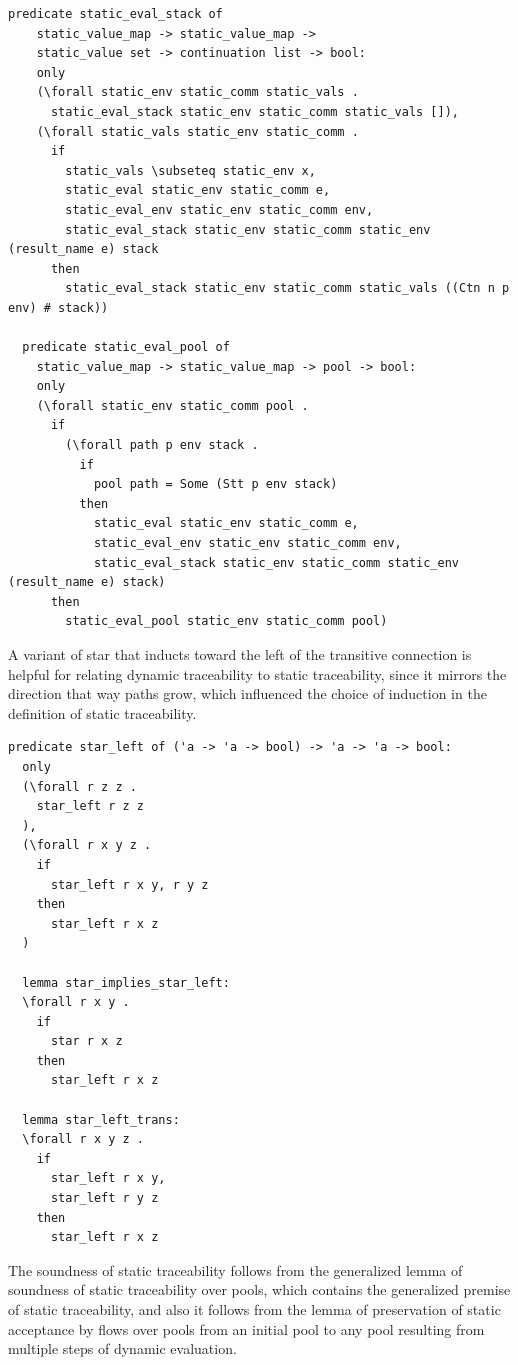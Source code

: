 \documentclass[10pt]{article}
\begin{document}
\begin{lstlisting}[language=logic, mathescape]
  predicate static_eval_stack of
    static_value_map -> static_value_map ->
    static_value set -> continuation list -> bool:
    only 
    (\forall static_env static_comm static_vals .
      static_eval_stack static_env static_comm static_vals []),
    (\forall static_vals static_env static_comm . 
      if 
        static_vals \subseteq static_env x,
        static_eval static_env static_comm e,
        static_eval_env static_env static_comm env,
        static_eval_stack static_env static_comm static_env (result_name e) stack 
      then
        static_eval_stack static_env static_comm static_vals ((Ctn n p env) # stack))

  predicate static_eval_pool of
    static_value_map -> static_value_map -> pool -> bool:
    only
    (\forall static_env static_comm pool .
      if
        (\forall path p env stack .
          if
            pool path = Some (Stt p env stack)
          then 
            static_eval static_env static_comm e,
            static_eval_env static_env static_comm env,
            static_eval_stack static_env static_comm static_env (result_name e) stack)
      then 
        static_eval_pool static_env static_comm pool)
  \end{lstlisting}


A variant of star that inducts toward the left of the transitive connection is helpful for
relating dynamic traceability to static traceability, since it mirrors the direction that way
paths grow, which influenced the choice of induction in the definition of static
traceability.

\begin{lstlisting}[language=logic, mathescape]
  predicate star_left of ('a -> 'a -> bool) -> 'a -> 'a -> bool:
  only
  (\forall r z z .
    star_left r z z
  ),
  (\forall r x y z .
    if
      star_left r x y, r y z
    then
      star_left r x z
  )

  lemma star_implies_star_left:
  \forall r x y .
    if
      star r x z
    then
      star_left r x z

  lemma star_left_trans:
  \forall r x y z .
    if 
      star_left r x y,
      star_left r y z 
    then
      star_left r x z
\end{lstlisting}

The soundness of static traceability follows from the generalized lemma
of soundness of static traceability over pools, which contains
the generalized premise of
static traceability, and also it follows from the lemma of preservation of static
acceptance by flows over pools from an initial pool to any pool resulting from multiple steps of
dynamic evaluation.
\end{document}
